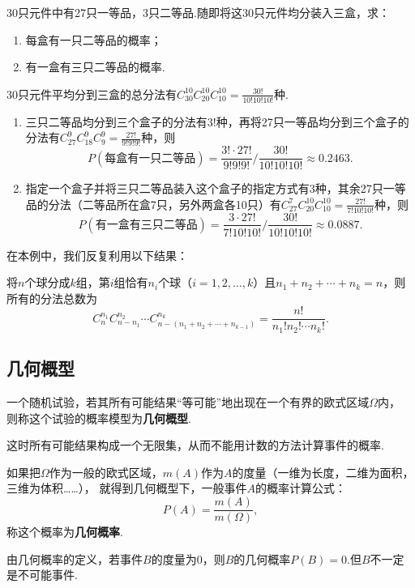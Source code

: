 \begin{example}
30只元件中有27只一等品，3只二等品.随即将这30只元件均分装入三盒，求：\begin{enumerate}
\item 每盒有一只二等品的概率；
\item 有一盒有三只二等品的概率.
\end{enumerate}
\begin{solution}
30只元件平均分到三盒的总分法有\(C_{30}^{10} C_{20}^{10} C_{10}^{10} = \frac{30!}{10! 10! 10!}\)种.
\begin{enumerate}
\item 三只二等品均分到三个盒子的分法有\(3!\)种，再将27只一等品均分到三个盒子的分法有\(C_{27}^9 C_{18}^9 C_9^9 = \frac{27!}{9! 9! 9!}\)种，则\[
P(\text{每盒有一只二等品})=\frac{3! \cdot 27!}{9! 9! 9!} \bigg/ \frac{30!}{10! 10! 10!} \approx 0.2463.
\]
\item 指定一个盒子并将三只二等品装入这个盒子的指定方式有\(3\)种，其余27只一等品的分法（二等品所在盒7只，另外两盒各10只）有\(C_{27}^7 C_{20}^{10} C_{10}^{10} = \frac{27!}{7! 10! 10!}\)种，则\[
P(\text{有一盒有三只二等品}) = \frac{3 \cdot 27!}{7! 10! 10!} \bigg/ \frac{30!}{10! 10! 10!} \approx 0.0887.
\]
\end{enumerate}
\end{solution}
在本例中，我们反复利用以下结果：

将\(n\)个球分成\(k\)组，第\(i\)组恰有\(n_i\)个球（\(i=1,2,\dotsc,k\)）且\(n_1+n_2+\dotsb+n_k=n\)，则所有的分法总数为\begin{equation}
C_n^{n_1} C_{n-n_1}^{n_2} \dotsm C_{n-(n_1+n_2+\dotsb+n_{k-1})}^{n_k}
= \frac{n!}{n_1! n_2! \dotsm n_k!}.
\end{equation}
\end{example}

\subsection{几何概型}
\begin{definition}
一个随机试验，若其所有可能结果“等可能”地出现在一个有界的欧式区域\(\Omega\)内，%
则称这个试验的概率模型为\textbf{几何概型}.
\end{definition}
这时所有可能结果构成一个无限集，从而不能用计数的方法计算事件的概率.

\begin{definition}
如果把\(\Omega\)作为一般的欧式区域，\(m(A)\)作为\(A\)的度量（一维为长度，二维为面积，三维为体积……），%
就得到几何概型下，一般事件\(A\)的概率计算公式：\[
P(A) = \frac{m(A)}{m(\Omega)},
\]称这个概率为\textbf{几何概率}.
\end{definition}
由几何概率的定义，若事件\(B\)的度量为0，则\(B\)的几何概率\(P(B)=0\).但\(B\)不一定是不可能事件.

